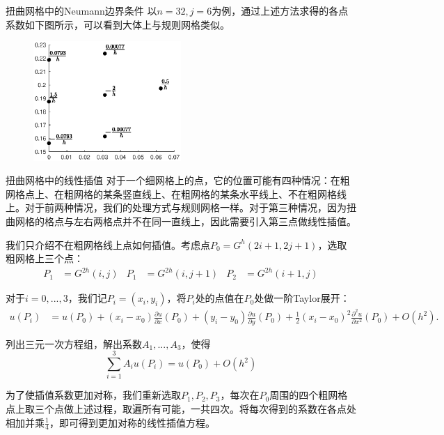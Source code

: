 \documentclass[9pt]{beamer}
\begin{document}
\begin{frame}{扭曲网格中的Neumann边界条件}
以$n=32,j=6$为例，通过上述方法求得的各点系数如下图所示，可以看到大体上与规则网格类似。

\begin{figure}[H]
  \centering
  \includegraphics[width=0.5\textwidth]{../report/figure/3-3.eps}
\end{figure}
\end{frame}

\begin{frame}{扭曲网格中的线性插值}
\small
对于一个细网格上的点，它的位置可能有四种情况：在粗网格点上、在粗网格的某条竖直线上、在粗网格的某条水平线上、不在粗网格线上。对于前两种情况，我们的处理方式与规则网格一样。对于第三种情况，因为扭曲网格的格点与左右两格点并不在同一直线上，因此需要引入第三点做线性插值。

\pause
我们只介绍不在粗网格线上点如何插值。考虑点$P_0=G^h(2i+1,2j+1)$，选取粗网格上三个点：
\begin{align*}
  P_1&=G^{2h}(i,j) & P_1&=G^{2h}(i,j+1) & P_2&=G^{2h}(i+1,j)
\end{align*}

\pause
对于$i=0,...,3$，我们记$P_i=(x_i,y_i)$，将$P_i$处的点值在$P_0$处做一阶Taylor展开：
\begin{align*}
  u(P_i)&=u(P_0)+(x_i-x_0)\frac{\partial u}{\partial x}(P_0)+(y_i-y_0)\frac{\partial u}{\partial y}(P_0)
  +\frac{1}{2}(x_i-x_0)^2\frac{\partial^2 u}{\partial x^2}(P_0) + O(h^2).
\end{align*}

\pause
列出三元一次方程组，解出系数$A_1,...,A_3$，使得
\begin{equation*}
  \sum_{i=1}^3 A_iu(P_i)=u(P_0)+O(h^2)
\end{equation*}

为了使插值系数更加对称，我们重新选取$P_1,P_2,P_3$，每次在$P_0$周围的四个粗网格点上取三个点做上述过程，取遍所有可能，一共四次。将每次得到的系数在各点处相加并乘$\frac{1}{4}$，即可得到更加对称的线性插值方程。
\end{frame}
\end{document}
